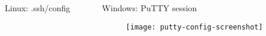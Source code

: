 \begin{frame}
\begin{columns}
    \begin{column}{0.5\textwidth}
      {\Large Linux: .ssh/config}
       
    \end{column}
    \begin{column}{0.5\textwidth}  %
   {\Large Windows: PuTTY session}
        \begin{figure}
        \centering
            \texttt{[image: putty-config-screenshot]} 
        \end{figure}
    \end{column}
\end{columns}
\end{frame}
